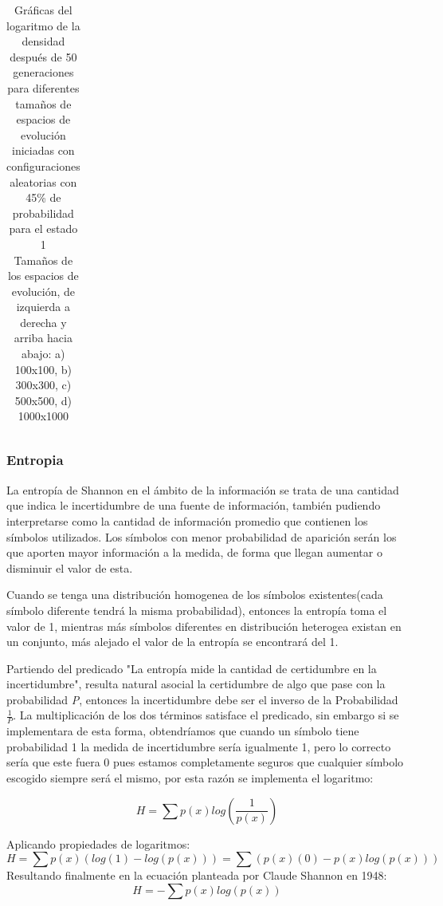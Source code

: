 \documentclass[]{article}
\begin{document}
\begin{table}[!h]
\begin{tabular}{c c}
				\end{tabular}
				\caption{Gráficas del logaritmo de la densidad después de 50 generaciones para diferentes tamaños de espacios de evolución iniciadas con configuraciones aleatorias con 45\% de probabilidad para el estado 1\\ Tamaños de los espacios de evolución, de izquierda a derecha y arriba hacia abajo: a) 100x100, b) 300x300, c) 500x500, d) 1000x1000}
			\end{table}
		
		\newpage
		\subsubsection{Entropia}
			La entropía de Shannon en el ámbito de la información se trata de una cantidad que indica le incertidumbre de una fuente de información, también pudiendo interpretarse como la cantidad de información promedio que contienen los símbolos utilizados. Los símbolos con menor probabilidad de aparición serán los que aporten mayor información a la medida, de forma que llegan aumentar o disminuir el valor de esta.
			
			Cuando se tenga una distribución homogenea de los símbolos existentes(cada símbolo diferente tendrá la misma probabilidad), entonces la entropía toma el valor de 1, mientras más símbolos diferentes en distribución heterogea existan en un conjunto, más alejado el valor de la entropía se encontrará del 1.
			
			Partiendo del predicado "La entropía mide la cantidad de certidumbre en la incertidumbre", resulta natural asocial la certidumbre de algo que pase con la probabilidad \textit{P}, entonces la incertidumbre debe ser el inverso de la Probabilidad $\frac{1}{P}$. La multiplicación de los dos términos satisface el predicado, sin embargo si se implementara de esta forma, obtendríamos que cuando un símbolo tiene probabilidad 1 la medida de incertidumbre sería igualmente 1, pero lo correcto sería que este fuera 0 pues estamos completamente seguros que cualquier símbolo escogido siempre será el mismo, por esta razón se implementa el logaritmo:
			
			$$
				H = \sum p(x) log\left(\frac{1}{p(x)}\right)
			$$
			
			Aplicando propiedades de logaritmos:
			$$
				H = \sum p(x)( log(1) - log(p(x)) ) = \sum(p(x)(0) - p(x)log(p(x)))
			$$
			Resultando finalmente en la ecuación planteada por Claude Shannon en 1948:
			$$
				H = -\sum p(x) log(p(x))
			$$
			
\end{document}
